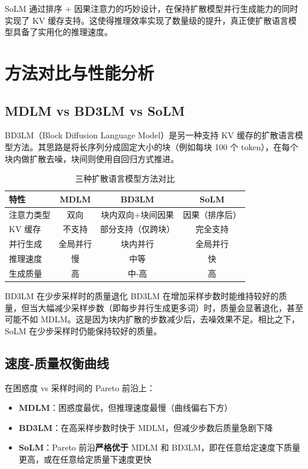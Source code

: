 \documentclass[a4paper]{article}
\begin{document}
SoLM 通过排序 + 因果注意力的巧妙设计，在保持扩散模型并行生成能力的同时实现了 KV 缓存支持。这使得推理效率实现了数量级的提升，真正使扩散语言模型具备了实用化的推理速度。

\newpage
\section{方法对比与性能分析}

\subsection{MDLM vs BD3LM vs SoLM}

BD3LM（Block Diffusion Language Model）是另一种支持 KV 缓存的扩散语言模型方法。其思路是将长序列分成固定大小的块（例如每块 100 个 token），在每个块内做扩散去噪，块间则使用自回归方式推进。

\begin{table}[H]
\centering
\caption{三种扩散语言模型方法对比}
\begin{tabular}{@{}lccc@{}}
\toprule
\textbf{特性} & \textbf{MDLM} & \textbf{BD3LM} & \textbf{SoLM} \\
\midrule
注意力类型 & 双向 & 块内双向+块间因果 & 因果（排序后） \\
KV 缓存 & 不支持 & 部分支持（仅跨块） & 完全支持 \\
并行生成 & 全局并行 & 块内并行 & 全局并行 \\
推理速度 & 慢 & 中等 & 快 \\
生成质量 & 高 & 中-高 & 高 \\
\bottomrule
\end{tabular}
\end{table}

\begin{warningbox}{BD3LM 在少步采样时的质量退化}
BD3LM 在增加采样步数时能维持较好的质量，但当大幅减少采样步数（即每步并行生成更多词）时，质量会显著退化，甚至可能不如 MDLM。这是因为块内扩散的步数减少后，去噪效果不足。相比之下，SoLM 在少步采样时仍能保持较好的质量。
\end{warningbox}

\subsection{速度-质量权衡曲线}

在困惑度 vs 采样时间的 Pareto 前沿上：

\begin{itemize}
    \item \textbf{MDLM}：困惑度最优，但推理速度最慢（曲线偏右下方）
    \item \textbf{BD3LM}：在高采样步数时快于 MDLM，但减少步数后质量急剧下降
    \item \textbf{SoLM}：Pareto 前沿\textbf{严格优于} MDLM 和 BD3LM，即在任意给定速度下质量更高，或在任意给定质量下速度更快
\end{itemize}
\end{document}
